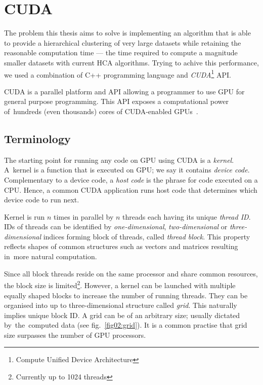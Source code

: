 \chapter{CUDA}

The problem this thesis aims to solve is implementing an algorithm that is able to provide a hierarchical clustering of very large datasets while retaining the reasonable computation time --- the time required to compute a magnitude smaller datasets with current HCA algorithms.
Trying to achive this performance, we used a combination of C++ programming language and \emph{CUDA}\footnote{Compute Unified Device Architecture} API.

CUDA is a parallel platform and API allowing a programmer to use GPU for general purpose programming. This API exposes a computational power of~hundreds (even thousands) cores of CUDA-enabled GPUs~\cite{cuda}.


\section{Terminology}

The starting point for running any code on GPU using CUDA is a \emph{kernel}. A~kernel is a function that is executed on GPU; we say it contains \emph{device code}. Complementary to a device code, a \emph{host code} is the phrase for code executed on a CPU. Hence, a common CUDA application runs host code that determines which device code to run next. 

Kernel is run $n$ times in parallel by $n$ threads each having its unique \emph{thread ID}. IDs of threads can be identified by \emph{one-dimensional}, \emph{two-dimensional} or \emph{three-dimensional} indices forming block of threads, called \emph{thread block}. This property reflects shapes of common structures such as vectors and matrices resulting in~more natural computation.

Since all block threads reside on the same processor and share common resources, the block size is limited\footnote{Currently up to 1024 threads}. However, a kernel can be launched with multiple equally shaped blocks to increase the number of running threads. They can be organised into up to three-dimensional structure called \emph{grid}. This naturally implies unique block ID. A grid can be of an arbitrary size; usually dictated by~the~computed data (see fig.~\ref{fig02:grid}). It is a common practise that grid size surpasses the number of GPU processors.


